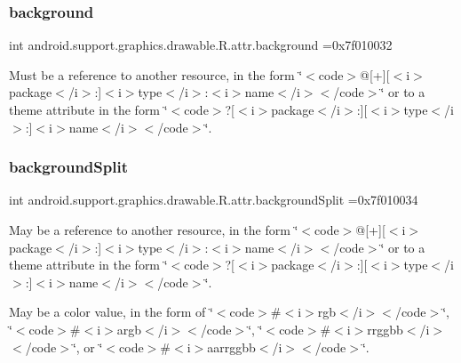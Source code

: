 \subsubsection{\texorpdfstring{background}{background}}
{\footnotesize\ttfamily int android.\+support.\+graphics.\+drawable.\+R.\+attr.\+background =0x7f010032\hspace{0.3cm}{\ttfamily [static]}}

Must be a reference to another resource, in the form \char`\"{}$<$code$>$@\mbox{[}+\mbox{]}\mbox{[}$<$i$>$package$<$/i$>$\+:\mbox{]}$<$i$>$type$<$/i$>$\+:$<$i$>$name$<$/i$>$$<$/code$>$\char`\"{} or to a theme attribute in the form \char`\"{}$<$code$>$?\mbox{[}$<$i$>$package$<$/i$>$\+:\mbox{]}\mbox{[}$<$i$>$type$<$/i$>$\+:\mbox{]}$<$i$>$name$<$/i$>$$<$/code$>$\char`\"{}. \mbox{\label{classandroid_1_1support_1_1graphics_1_1drawable_1_1R_1_1attr_abc58ade3a6d1866f87291818d520f6fe}} 
\subsubsection{\texorpdfstring{background\+Split}{backgroundSplit}}
{\footnotesize\ttfamily int android.\+support.\+graphics.\+drawable.\+R.\+attr.\+background\+Split =0x7f010034\hspace{0.3cm}{\ttfamily [static]}}

May be a reference to another resource, in the form \char`\"{}$<$code$>$@\mbox{[}+\mbox{]}\mbox{[}$<$i$>$package$<$/i$>$\+:\mbox{]}$<$i$>$type$<$/i$>$\+:$<$i$>$name$<$/i$>$$<$/code$>$\char`\"{} or to a theme attribute in the form \char`\"{}$<$code$>$?\mbox{[}$<$i$>$package$<$/i$>$\+:\mbox{]}\mbox{[}$<$i$>$type$<$/i$>$\+:\mbox{]}$<$i$>$name$<$/i$>$$<$/code$>$\char`\"{}. 

May be a color value, in the form of \char`\"{}$<$code$>$\#$<$i$>$rgb$<$/i$>$$<$/code$>$\char`\"{}, \char`\"{}$<$code$>$\#$<$i$>$argb$<$/i$>$$<$/code$>$\char`\"{}, \char`\"{}$<$code$>$\#$<$i$>$rrggbb$<$/i$>$$<$/code$>$\char`\"{}, or \char`\"{}$<$code$>$\#$<$i$>$aarrggbb$<$/i$>$$<$/code$>$\char`\"{}. \mbox{\label{classandroid_1_1support_1_1graphics_1_1drawable_1_1R_1_1attr_a17d61902a109d852883a2b8061f97db9}} 
